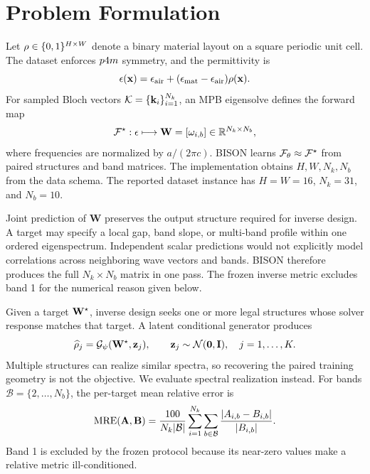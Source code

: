 
\section{Problem Formulation}

Let \(\rho\in\{0,1\}^{H\times W}\) denote a binary material layout on a
square periodic unit cell. The dataset enforces \(p4m\) symmetry, and the
permittivity is
\begin{equation}
  \epsilon(\mathbf{x})=\epsilon_{\mathrm{air}}+
  (\epsilon_{\mathrm{mat}}-\epsilon_{\mathrm{air}})\rho(\mathbf{x}).
  \label{eq:permittivity}
\end{equation}
For sampled Bloch vectors
\(\mathcal{K}=\{\mathbf{k}_i\}_{i=1}^{N_k}\), an MPB eigensolve defines the
forward map
\begin{equation}
  \mathcal{F}^{\star}:\epsilon\longmapsto
  \mathbf{W}=[\omega_{i,b}]\in\mathbb{R}^{N_k\times N_b},
  \label{eq:physical-forward}
\end{equation}
where frequencies are normalized by \(a/(2\pi c)\). BISON learns
\(\mathcal{F}_{\theta}\approx\mathcal{F}^{\star}\) from paired structures and band
matrices. The implementation obtains \(H,W,N_k,N_b\) from the data schema. The
reported dataset instance has \(H=W=16\), \(N_k=31\), and \(N_b=10\).

Joint prediction of \(\mathbf{W}\) preserves the output structure required for
inverse design. A target may specify a local gap, band slope, or multi-band
profile within one ordered eigenspectrum. Independent scalar predictions would
not explicitly model correlations across neighboring wave vectors and bands.
BISON therefore produces the full \(N_k\times N_b\) matrix in one pass. The
frozen inverse metric excludes band 1 for the numerical reason given below.

Given a target \(\mathbf{W}^{\star}\), inverse design seeks one or more legal
structures whose solver response matches that target. A latent conditional
generator produces
\begin{equation}
  \widehat{\rho}_{j}=\mathcal{G}_{\psi}(\mathbf{W}^{\star},\mathbf{z}_j),
  \qquad \mathbf{z}_j\sim\mathcal{N}(\mathbf{0},\mathbf{I}),
  \quad j=1,\ldots,K.
  \label{eq:inverse-generation}
\end{equation}
Multiple structures can realize similar spectra, so recovering the paired
training geometry is not the objective. We evaluate spectral realization
instead. For bands \(\mathcal{B}=\{2,\ldots,N_b\}\), the per-target mean
relative error is
\begin{equation}
  \operatorname{MRE}(\mathbf{A},\mathbf{B})=
  \frac{100}{N_k|\mathcal{B}|}
  \sum_{i=1}^{N_k}\sum_{b\in\mathcal{B}}
  \frac{|A_{i,b}-B_{i,b}|}{|B_{i,b}|}.
  \label{eq:mre}
\end{equation}
Band 1 is excluded by the frozen protocol because its near-zero values make a
relative metric ill-conditioned.

